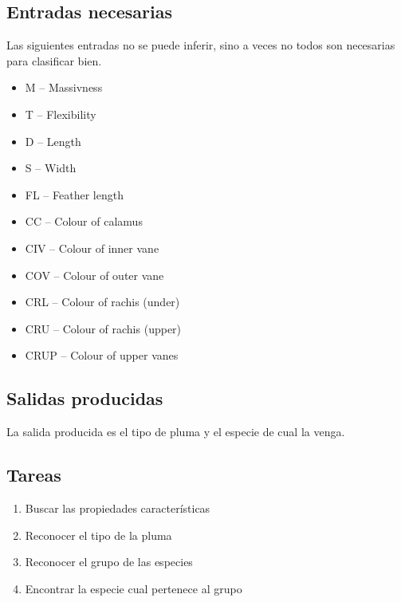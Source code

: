 \documentclass[a4paper,12pt]{article}
\begin{document}
\subsection{Entradas necesarias}
Las siguientes entradas no se puede inferir, sino a veces no todos son necesarias para clasificar bien.
\begin{itemize}
	\item M -- Massivness
	\item T -- Flexibility
	\item D -- Length
	\item S -- Width
	\item FL -- Feather length
	\item CC -- Colour of calamus
	\item CIV -- Colour of inner vane
	\item COV -- Colour of outer vane
	\item CRL -- Colour of rachis (under)
	\item CRU -- Colour of rachis (upper)
	\item CRUP -- Colour of upper vanes
\end{itemize}

\subsection{Salidas producidas}
La salida producida es el tipo de pluma y el especie de cual la venga.

\subsection{Tareas}
\begin{enumerate}
	\item Buscar las propiedades características
	\item Reconocer el tipo de la pluma
	\item Reconocer el grupo de las especies
	\item Encontrar la especie cual pertenece al grupo
\end{enumerate}
\end{document}
